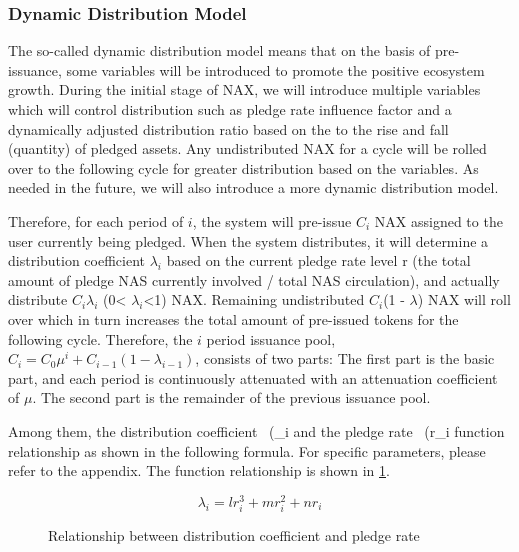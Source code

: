 \subsubsection{Dynamic Distribution Model}
The so-called dynamic distribution model means that on the basis of pre-issuance, some variables will be introduced to promote the positive ecosystem growth. During the initial stage of NAX, we will introduce multiple variables which will control distribution such as pledge rate influence factor and a dynamically adjusted  distribution ratio based on the to the rise and fall (quantity) of pledged assets. Any undistributed NAX for a cycle will be rolled over to the following cycle for greater distribution based on the variables. As needed in the future, we will also introduce a more dynamic distribution model.

Therefore, for each period of $i$, the system will pre-issue $C_i$ NAX assigned to the user currently being pledged. When the system distributes, it will determine a distribution coefficient $\lambda_i$ based on the current pledge rate level r (the total amount of pledge NAS currently involved / total NAS circulation), and actually distribute $C_i$$\lambda_i$ (0< $\lambda_i$<1) NAX. Remaining undistributed $C_i$(1 - $\lambda$) NAX will roll over which in turn increases the total amount of pre-issued tokens for the following cycle. Therefore, the \(i\) period issuance pool, \(C_i = C_0 \mu^i + C_{i-1} (1-\lambda_{i-1})\), consists of two parts: The first part is the basic part, and each period is continuously attenuated with an attenuation coefficient of $\mu$. The second part is the remainder of the previous issuance pool.

Among them, the distribution coefficient \ (\lambda_i \) and the pledge rate \ (r_i \) function relationship as shown in the following formula. For specific parameters, please refer to the appendix. The function relationship is shown in \ref{func}.

  \begin{equation}
    \lambda_i = l r_i^3 + m r_i^2 + n r_i
  \end{equation}

\begin{figure}
\centering
    \caption{Relationship between distribution coefficient and pledge rate}\label{func}
\end{figure}



